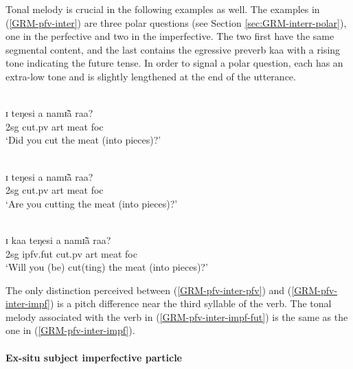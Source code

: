 \begin{exe}
\begin{exe}
\begin{exe}
\begin{exe}
\begin{exe}
\begin{exe}
\begin{exe}
\begin{exe}
\begin{exe}
\begin{exe}
\begin{exe}
Tonal melody is crucial in the following examples as well. The examples in (\ref{GRM-pfv-inter}) are three polar questions (see Section \ref{sec:GRM-interr-polar}), one in the perfective and two in the imperfective. The two first have the same segmental content, and the last contains the egressive preverb {\sls kaa} with a rising tone indicating the future tense.  In order to signal a polar question, each has  an extra-low tone and is slightly lengthened at the end of the utterance. 

\ea\label{GRM-pfv-inter}


\ea\label{GRM-pfv-inter-pfv}
\glll {\Ttwo} {\Tnine \Tnine \Tnine} {\Tthree} {\Tthree \Tthree} {\Tone\Tone}\\
 ɪ   teŋesi  a  namɪ̃ã  raa?\\
    {\sc 2sg} {cut.{\sc pv}} {\sc art} {meat} {\sc foc}\\
\glt `Did you cut the meat (into pieces)?'\\



\ex\label{GRM-pfv-inter-impf}

\glll {\Ttwo} {\Tnine \Tnine \Tfour} {\Tthree} {\Tthree \Tthree} {\Tone\Tone}\\
ɪ   teŋesi  a  namɪ̃ã  raa?\\
    {\sc 2sg} {cut.{\sc pv}} {\sc art} {meat} {\sc foc}\\
\glt `Are you cutting the meat (into pieces)?'\\


\ex\label{GRM-pfv-inter-impf-fut}


\glll {\Ttwo} {\Tfive \Teight} {\Tseven \Tseven \Tthree} {\Tthree} {\Tthree \Tthree} {\Tone \Tone}\\
ɪ  kaa teŋesi  a  namɪ̃ã  raa?\\
    {\sc 2sg} {\sc ipfv.fut} {cut.{\sc pv}} {\sc art} {meat} {\sc foc}\\
\glt  `Will you (be) cut(ting) the meat (into pieces)?'\\
\z 
 \z

The only distinction perceived between (\ref{GRM-pfv-inter-pfv})  and (\ref{GRM-pfv-inter-impf}) is a pitch difference near the third syllable of the verb. The tonal melody associated with the verb in (\ref{GRM-pfv-inter-impf-fut}) is the same as the one in (\ref{GRM-pfv-inter-impf}).


\paragraph{Ex-situ subject imperfective particle}
\label{sec:GRM-ipfv-part}


\end{exe}
\end{exe}
\end{exe}
\end{exe}
\end{exe}
\end{exe}
\end{exe}
\end{exe}
\end{exe}
\end{exe}
\end{exe}
